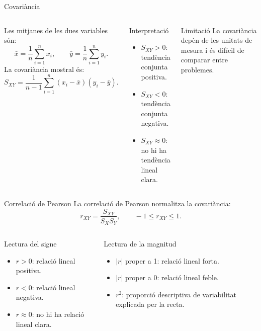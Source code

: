 \documentclass[10pt,aspectratio=169]{beamer}
\begin{document}
\begin{frame}{Covariància}
\begin{columns}[T]
Les mitjanes de les dues variables són:
\[
 \bar{x}=\frac{1}{n}\sum_{i=1}^n x_i,\qquad
 \bar{y}=\frac{1}{n}\sum_{i=1}^n y_i.
\]
La covariància mostral és:
\[
 S_{XY}=\frac{1}{n-1}\sum_{i=1}^n (x_i-\bar{x})(y_i-\bar{y}).
\]
\begin{block}{Interpretació}
\begin{itemize}
  \item $S_{XY}>0$: tendència conjunta positiva.
  \item $S_{XY}<0$: tendència conjunta negativa.
  \item $S_{XY}\approx 0$: no hi ha tendència lineal clara.
\end{itemize}
\end{block}
\begin{alertblock}{Limitació}
La covariància depèn de les unitats de mesura i és difícil de comparar entre problemes.
\end{alertblock}
\end{columns}
\end{frame}

\begin{frame}{Correlació de Pearson}
La correlació de Pearson normalitza la covariància:
\[
 r_{XY}=\frac{S_{XY}}{S_XS_Y},\qquad -1\leq r_{XY}\leq 1.
\]
\vspace{0.2cm}
\begin{columns}[T]
\begin{block}{Lectura del signe}
\begin{itemize}
  \item $r>0$: relació lineal positiva.
  \item $r<0$: relació lineal negativa.
  \item $r\approx 0$: no hi ha relació lineal clara.
\end{itemize}
\end{block}
\begin{block}{Lectura de la magnitud}
\begin{itemize}
  \item $|r|$ proper a 1: relació lineal forta.
  \item $|r|$ proper a 0: relació lineal feble.
  \item $r^2$: proporció descriptiva de variabilitat explicada per la recta.
\end{itemize}
\end{block}
\end{columns}
\end{frame}
\end{document}
